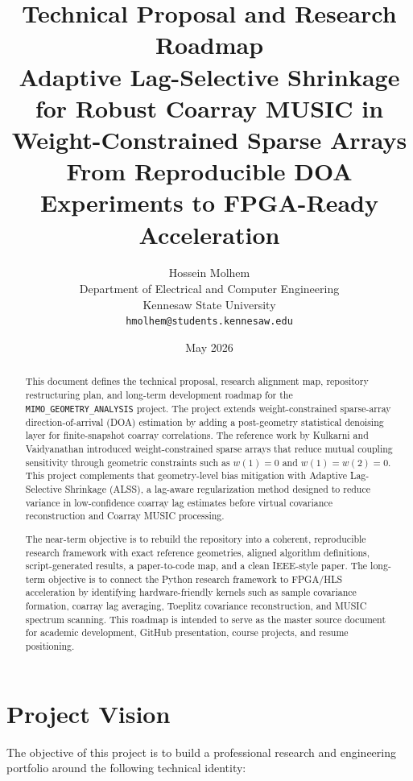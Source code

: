 \documentclass[11pt,letterpaper]{article}
\title{\textbf{Technical Proposal and Research Roadmap}\\[0.4em]
\Large Adaptive Lag-Selective Shrinkage for Robust Coarray MUSIC in Weight-Constrained Sparse Arrays\\[0.3em]
\large From Reproducible DOA Experiments to FPGA-Ready Acceleration}
\author{Hossein Molhem\\
Department of Electrical and Computer Engineering\\
Kennesaw State University\\
\texttt{hmolhem@students.kennesaw.edu}}
\date{May 2026}
\newcommand{\codepath}[1]{\texttt{#1}}
\newcommand{\ALSS}{\textsc{ALSS}}
\begin{document}
\maketitle

\begin{abstract}
This document defines the technical proposal, research alignment map, repository restructuring plan, and long-term development roadmap for the \codepath{MIMO\_GEOMETRY\_ANALYSIS} project. The project extends weight-constrained sparse-array direction-of-arrival (DOA) estimation by adding a post-geometry statistical denoising layer for finite-snapshot coarray correlations. The reference work by Kulkarni and Vaidyanathan introduced weight-constrained sparse arrays that reduce mutual coupling sensitivity through geometric constraints such as $w(1)=0$ and $w(1)=w(2)=0$. This project complements that geometry-level bias mitigation with Adaptive Lag-Selective Shrinkage (\ALSS), a lag-aware regularization method designed to reduce variance in low-confidence coarray lag estimates before virtual covariance reconstruction and Coarray MUSIC processing.

The near-term objective is to rebuild the repository into a coherent, reproducible research framework with exact reference geometries, aligned algorithm definitions, script-generated results, a paper-to-code map, and a clean IEEE-style paper. The long-term objective is to connect the Python research framework to FPGA/HLS acceleration by identifying hardware-friendly kernels such as sample covariance formation, coarray lag averaging, Toeplitz covariance reconstruction, and MUSIC spectrum scanning. This roadmap is intended to serve as the master source document for academic development, GitHub presentation, course projects, and resume positioning.
\end{abstract}

\tableofcontents
\newpage

\section{Project Vision}

The objective of this project is to build a professional research and engineering portfolio around the following technical identity:

\begin{center}
\end{center}
\end{document}
